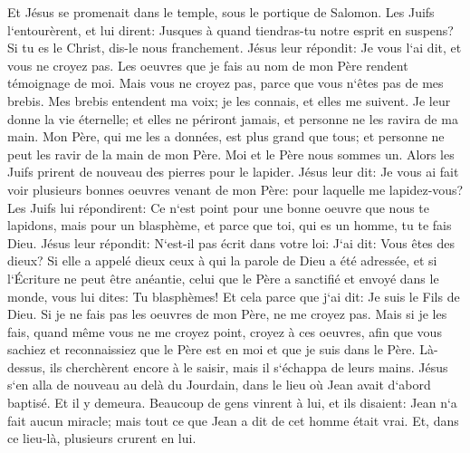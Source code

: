 \verse Et Jésus se promenait dans le temple, sous le portique de Salomon. 
\verse Les Juifs l`entourèrent, et lui dirent: Jusques à quand tiendras-tu notre esprit en suspens? Si tu es le Christ, dis-le nous franchement. 
\verse Jésus leur répondit: Je vous l`ai dit, et vous ne croyez pas. Les oeuvres que je fais au nom de mon Père rendent témoignage de moi. 
\verse Mais vous ne croyez pas, parce que vous n`êtes pas de mes brebis. 
\verse Mes brebis entendent ma voix; je les connais, et elles me suivent. 
\verse Je leur donne la vie éternelle; et elles ne périront jamais, et personne ne les ravira de ma main. 
\verse Mon Père, qui me les a données, est plus grand que tous; et personne ne peut les ravir de la main de mon Père. 
\verse Moi et le Père nous sommes un. 
\verse Alors les Juifs prirent de nouveau des pierres pour le lapider. 
\verse Jésus leur dit: Je vous ai fait voir plusieurs bonnes oeuvres venant de mon Père: pour laquelle me lapidez-vous? 
\verse Les Juifs lui répondirent: Ce n`est point pour une bonne oeuvre que nous te lapidons, mais pour un blasphème, et parce que toi, qui es un homme, tu te fais Dieu. 
\verse Jésus leur répondit: N`est-il pas écrit dans votre loi: J`ai dit: Vous êtes des dieux? 
\verse Si elle a appelé dieux ceux à qui la parole de Dieu a été adressée, et si l`Écriture ne peut être anéantie, 
\verse celui que le Père a sanctifié et envoyé dans le monde, vous lui dites: Tu blasphèmes! Et cela parce que j`ai dit: Je suis le Fils de Dieu. 
\verse Si je ne fais pas les oeuvres de mon Père, ne me croyez pas. 
\verse Mais si je les fais, quand même vous ne me croyez point, croyez à ces oeuvres, afin que vous sachiez et reconnaissiez que le Père est en moi et que je suis dans le Père. 
\verse Là-dessus, ils cherchèrent encore à le saisir, mais il s`échappa de leurs mains. 
\verse Jésus s`en alla de nouveau au delà du Jourdain, dans le lieu où Jean avait d`abord baptisé. Et il y demeura. 
\verse Beaucoup de gens vinrent à lui, et ils disaient: Jean n`a fait aucun miracle; mais tout ce que Jean a dit de cet homme était vrai. 
\verse Et, dans ce lieu-là, plusieurs crurent en lui. 

\chapter{}

